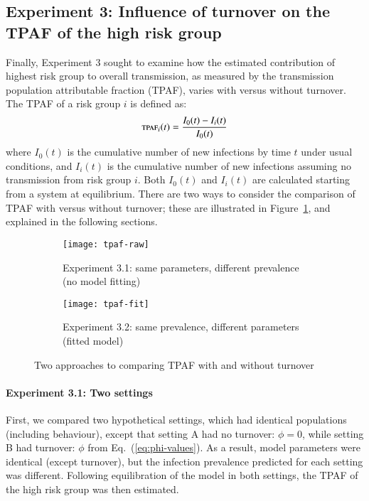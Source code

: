 \subsection{Experiment 3: Influence of turnover on the TPAF of the high risk group}
\label{ss:exp-tpaf}
Finally, Experiment 3 sought to examine how
the estimated contribution of highest risk group to overall transmission,
as measured by the transmission population attributable fraction (TPAF),
varies with versus without turnover.
The TPAF of a risk group $i$ is defined as:
\begin{equation}
  \textsc{tpaf}_i(t) = \frac{I_0(t) - I_i(t)}{I_0(t)}
\end{equation}
where $I_0(t)$ is the cumulative number of new infections
by time $t$ under usual conditions,
and $I_i(t)$ is the cumulative number of new infections
assuming no transmission from risk group $i$.
Both $I_0(t)$ and $I_i(t)$ are calculated
starting from a system at equilibrium.
There are two ways to consider the comparison of TPAF with versus without turnover;
these are illustrated in Figure~\ref{fig:exp-tpaf},
and explained in the following sections.
\begin{figure}
  \centering
  \begin{subfigure}{0.48\linewidth}
    \centering
    \texttt{[image: tpaf-raw]}
    \caption{Experiment 3.1: same parameters, different prevalence (no model fitting)}
  \end{subfigure}
  \begin{subfigure}{0.48\linewidth}
    \centering
    \texttt{[image: tpaf-fit]}
    \caption{Experiment 3.2: same prevalence, different parameters (fitted model)}
  \end{subfigure}
  \caption{Two approaches to comparing TPAF with and without turnover}
  \label{fig:exp-tpaf}
\end{figure}
\paragraph{Experiment 3.1: Two settings}
\label{p:exp-tpaf-raw}
First, we compared two hypothetical settings,
which had identical populations (including behaviour), except that
setting A had no turnover: $\phi = 0$, while
setting B had turnover: $\phi$ from Eq.~(\ref{eq:phi-values}).
As a result, model parameters were identical (except turnover),
but the infection prevalence predicted for each setting was different.
Following equilibration of the model in both settings,
the TPAF of the high risk group was then estimated.
